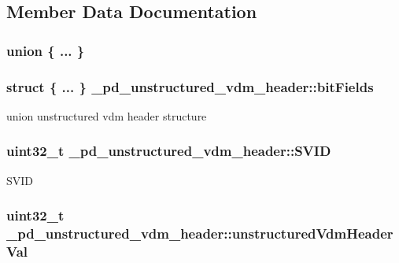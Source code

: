 \subsection{Member Data Documentation}
\hypertarget{struct__pd__unstructured__vdm__header_ad8448cf2b2b7e316fd5ba3db007e8c0c}{\subsubsection[{"@44}]{\setlength{\rightskip}{0pt plus 5cm}union \{ ... \} }}\label{struct__pd__unstructured__vdm__header_ad8448cf2b2b7e316fd5ba3db007e8c0c}
\hypertarget{struct__pd__unstructured__vdm__header_aebbb7159bc0e5a41e886be38105a0415}{
\subsubsection[{bit\-Fields}]{\setlength{\rightskip}{0pt plus 5cm}struct \{ ... \}   \-\_\-pd\-\_\-unstructured\-\_\-vdm\-\_\-header\-::bit\-Fields}}\label{struct__pd__unstructured__vdm__header_aebbb7159bc0e5a41e886be38105a0415}
union unstructured vdm header structure \hypertarget{struct__pd__unstructured__vdm__header_a9d9868b9f35518f7b5517340182095b9}{
\subsubsection[{S\-V\-I\-D}]{\setlength{\rightskip}{0pt plus 5cm}uint32\-\_\-t \-\_\-pd\-\_\-unstructured\-\_\-vdm\-\_\-header\-::\-S\-V\-I\-D}}\label{struct__pd__unstructured__vdm__header_a9d9868b9f35518f7b5517340182095b9}
S\-V\-I\-D \hypertarget{struct__pd__unstructured__vdm__header_aa0c6093c5429761509c65ae29a61e0a7}{
\subsubsection[{unstructured\-Vdm\-Header\-Val}]{\setlength{\rightskip}{0pt plus 5cm}uint32\-\_\-t \-\_\-pd\-\_\-unstructured\-\_\-vdm\-\_\-header\-::unstructured\-Vdm\-Header\-Val}}\label{struct__pd__unstructured__vdm__header_aa0c6093c5429761509c65ae29a61e0a7}
